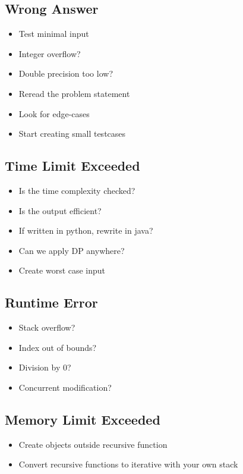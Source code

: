 \documentclass[8pt,a4paper,landscape,oneside]{amsart}
\begin{document}
\begin{multicols*}{3}
  \subsection{Wrong Answer}
    \begin{itemize}
    \item Test minimal input
    \item Integer overflow?
    \item Double precision too low?
    \item Reread the problem statement
    \item Look for edge-cases
    \item Start creating small testcases
    \end{itemize}
  \subsection{Time Limit Exceeded}
    \begin{itemize}
    \item Is the time complexity checked?
    \item Is the output efficient?
    \item If written in python, rewrite in java?
    \item Can we apply DP anywhere?
    \item Create worst case input
    \end{itemize}
  \subsection{Runtime Error}
    \begin{itemize}
    \item Stack overflow?
    \item Index out of bounds?
    \item Division by $0$?
    \item Concurrent modification?
    \end{itemize}
  \subsection{Memory Limit Exceeded}
    \begin{itemize}
    \item Create objects outside recursive function
    \item Convert recursive functions to iterative with your own stack
    \end{itemize}
        

\end{multicols*}
\end{document}
